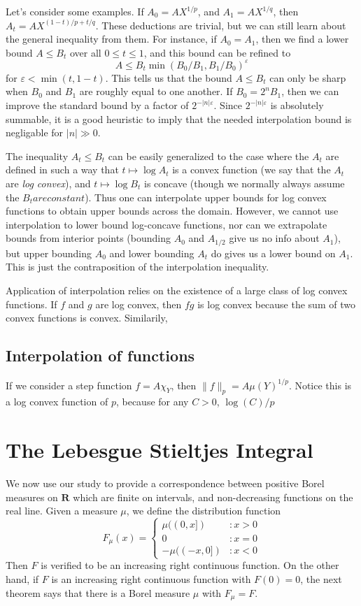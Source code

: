 Let's consider some examples. If $A_0 = AX^{1/p}$, and $A_1 = AX^{1/q}$, then $A_t = AX^{(1-t)/p + t/q}$. These deductions are trivial, but we can still learn about the general inequality from them. For instance, if $A_0 = A_1$, then we find a lower bound $A \leq B_t$ over all $0 \leq t \leq 1$, and this bound can be refined to
%
\[ A \leq B_t \min(B_0/B_1,B_1/B_0)^\varepsilon \]
%
for $\varepsilon < \min(t, 1-t)$. This tells us that the bound $A \leq B_t$ can only be sharp when $B_0$ and $B_1$ are roughly equal to one another. If $B_0 = 2^n B_1$, then we can improve the standard bound by a factor of $2^{-|n| \varepsilon}$. Since $2^{-|n| \varepsilon}$ is absolutely summable, it is a good heuristic to imply that the needed interpolation bound is negligable for $|n| \gg 0$.

The inequality $A_t \leq B_t$ can be easily generalized to the case where the $A_t$ are defined in such a way that $t \mapsto \log A_t$ is a convex function (we say that the $A_t$ are {\it log convex}), and $t \mapsto \log B_t$ is concave (though we normally always assume the $B_t are constant$). Thus one can interpolate upper bounds for log convex functions to obtain upper bounds across the domain. However, we cannot use interpolation to lower bound log-concave functions, nor can we extrapolate bounds from interior points (bounding $A_0$ and $A_{1/2}$ give us no info about $A_1$), but upper bounding $A_0$ and lower bounding $A_t$ do gives us a lower bound on $A_1$. This is just the contraposition of the interpolation inequality.

Application of interpolation relies on the existence of a large class of log convex functions. If $f$ and $g$ are log convex, then $fg$ is log convex because the sum of two convex functions is convex. Similarily,

\section{Interpolation of functions}

If we consider a step function $f = A \chi_Y$, then $\| f \|_p = A \mu(Y)^{1/p}$. Notice this is a log convex function of $p$, because for any $C > 0$, $\log(C)/p$

\chapter{The Lebesgue Stieltjes Integral}

We now use our study to provide a correspondence between positive Borel measures on $\mathbf{R}$ which are finite on intervals, and non-decreasing functions on the real line. Given a measure $\mu$, we define the distribution function
%
\[ F_\mu(x) = \begin{cases} \mu((0,x]) & : x > 0 \\ 0 & : x = 0\\ - \mu((-x, 0]) & : x < 0 \end{cases} \]
%
Then $F$ is verified to be an increasing right continuous function. On the other hand, if $F$ is an increasing right continuous function with $F(0) = 0$, the next theorem says that there is a Borel measure $\mu$ with $F_\mu = F$.

